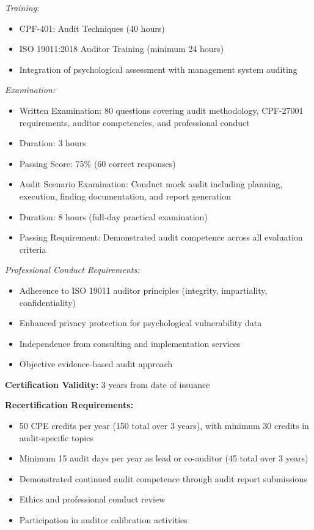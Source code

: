 \documentclass[11pt,a4paper]{article}
\begin{document}
\textit{Training:}
\begin{itemize}
\item CPF-401: Audit Techniques (40 hours)
\item ISO 19011:2018 Auditor Training (minimum 24 hours)
\item Integration of psychological assessment with management system auditing
\end{itemize}

\textit{Examination:}
\begin{itemize}
\item Written Examination: 80 questions covering audit methodology, CPF-27001 requirements, auditor competencies, and professional conduct
\item Duration: 3 hours
\item Passing Score: 75\% (60 correct responses)
\item Audit Scenario Examination: Conduct mock audit including planning, execution, finding documentation, and report generation
\item Duration: 8 hours (full-day practical examination)
\item Passing Requirement: Demonstrated audit competence across all evaluation criteria
\end{itemize}

\textit{Professional Conduct Requirements:}
\begin{itemize}
\item Adherence to ISO 19011 auditor principles (integrity, impartiality, confidentiality)
\item Enhanced privacy protection for psychological vulnerability data
\item Independence from consulting and implementation services
\item Objective evidence-based audit approach
\end{itemize}

\textbf{Certification Validity:} 3 years from date of issuance

\textbf{Recertification Requirements:}
\begin{itemize}
\item 50 CPE credits per year (150 total over 3 years), with minimum 30 credits in audit-specific topics
\item Minimum 15 audit days per year as lead or co-auditor (45 total over 3 years)
\item Demonstrated continued audit competence through audit report submissions
\item Ethics and professional conduct review
\item Participation in auditor calibration activities
\end{itemize}
\end{document}
